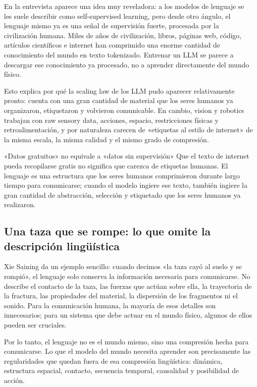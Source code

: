 En la entrevista aparece una idea muy reveladora: a los modelos de lenguaje se les suele describir como self-supervised learning, pero desde otro ángulo, el lenguaje mismo ya es una señal de supervisión fuerte, procesada por la civilización humana. Miles de años de civilización, libros, páginas web, código, artículos científicos e internet han comprimido una enorme cantidad de conocimiento del mundo en texto tokenizado. Entrenar un LLM se parece a descargar ese conocimiento ya procesado, no a aprender directamente del mundo físico.

Esto explica por qué la scaling law de los LLM pudo aparecer relativamente pronto: cuenta con una gran cantidad de material que los seres humanos ya organizaron, etiquetaron y volvieron comunicable. En cambio, vision y robotics trabajan con raw sensory data, acciones, espacio, restricciones físicas y retroalimentación, y por naturaleza carecen de «etiquetas al estilo de internet» de la misma escala, la misma calidad y el mismo grado de compresión.

\begin{warningbox}{«Datos gratuitos» no equivale a «datos sin supervisión»}
Que el texto de internet pueda recopilarse gratis no significa que carezca de etiquetas humanas. El lenguaje es una estructura que los seres humanos comprimieron durante largo tiempo para comunicarse; cuando el modelo ingiere ese texto, también ingiere la gran cantidad de abstracción, selección y etiquetado que los seres humanos ya realizaron.
\end{warningbox}

\subsection{Una taza que se rompe: lo que omite la descripción lingüística}

Xie Saining da un ejemplo sencillo: cuando decimos «la taza cayó al suelo y se rompió», el lenguaje solo conserva la información necesaria para comunicarse. No describe el contacto de la taza, las fuerzas que actúan sobre ella, la trayectoria de la fractura, las propiedades del material, la dispersión de los fragmentos ni el sonido. Para la comunicación humana, la mayoría de esos detalles son innecesarios; para un sistema que debe actuar en el mundo físico, algunos de ellos pueden ser cruciales.

Por lo tanto, el lenguaje no es el mundo mismo, sino una compresión hecha para comunicarse. Lo que el modelo del mundo necesita aprender son precisamente las regularidades que quedan fuera de esa compresión lingüística: dinámica, estructura espacial, contacto, secuencia temporal, causalidad y posibilidad de acción.

